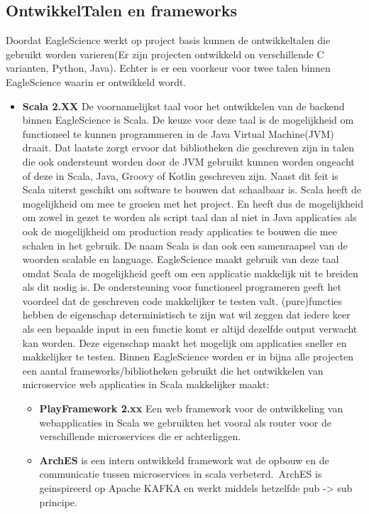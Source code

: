 \subsection{OntwikkelTalen en frameworks}\label{subsec:ontwikkeltalen-en-frameworks}
Doordat EagleScience werkt op project basis kunnen de ontwikkeltalen die gebruikt worden varieren(Er zijn projecten ontwikkeld on verschillende C varianten, Python, Java). Echter is er een voorkeur voor twee talen binnen EagleScience waarin er ontwikkeld wordt.
\begin{itemize}
    \item \textbf{Scala 2.XX} De voornamelijkst taal voor het ontwikkelen van de backend binnen EagleScience is Scala. De keuze voor deze taal is de mogelijkheid om functioneel te kunnen programmeren in de Java Virtual Machine(JVM) draait. Dat laatste zorgt ervoor dat bibliotheken die geschreven zijn in talen die ook ondersteunt worden door de JVM gebruikt kunnen worden ongeacht of deze in Scala, Java, Groovy of Kotlin geschreven zijn. Naast dit feit is Scala uiterst geschikt om software te bouwen dat schaalbaar is. Scala heeft de mogelijkheid om mee te groeien met het project. En heeft dus de mogelijkheid om zowel in gezet te worden als script taal dan al niet in Java applicaties als ook de mogelijkheid om production ready applicaties te bouwen die mee schalen in het gebruik. De naam Scala is dan ook een samenraapsel van de woorden scalable en language.
    EagleScience maakt gebruik van deze taal omdat Scala de mogelijkheid geeft om een applicatie makkelijk uit te breiden als dit nodig is. De ondersteuning voor functioneel programeren geeft het voordeel dat de geschreven code makkelijker te testen valt. (pure)functies hebben de eigenschap deterministisch te zijn wat wil zeggen dat iedere keer als een bepaalde input in een functie komt er altijd dezelfde output verwacht kan worden. Deze eigenschap maakt het mogelijk om applicaties sneller en makkelijker te testen. Binnen EagleScience worden er in bijna alle projecten een aantal frameworks/bibliotheken gebruikt die het ontwikkelen van microservice web applicaties in Scala makkelijker maakt:
    \begin{itemize}
        \item \textbf{PlayFramework 2.xx} Een web framework voor de ontwikkeling van webapplicaties in Scala we gebruikten het vooral als router voor de verschillende microservices die er achterliggen.
        \item \textbf{ArchES} is een intern ontwikkeld framework wat de opbouw en de communicatie tussen microservices in scala verbeterd.\ ArchES is geinspireerd op Apache KAFKA en werkt middels hetzelfde pub -> sub principe.

\end{itemize}
\end{itemize}
